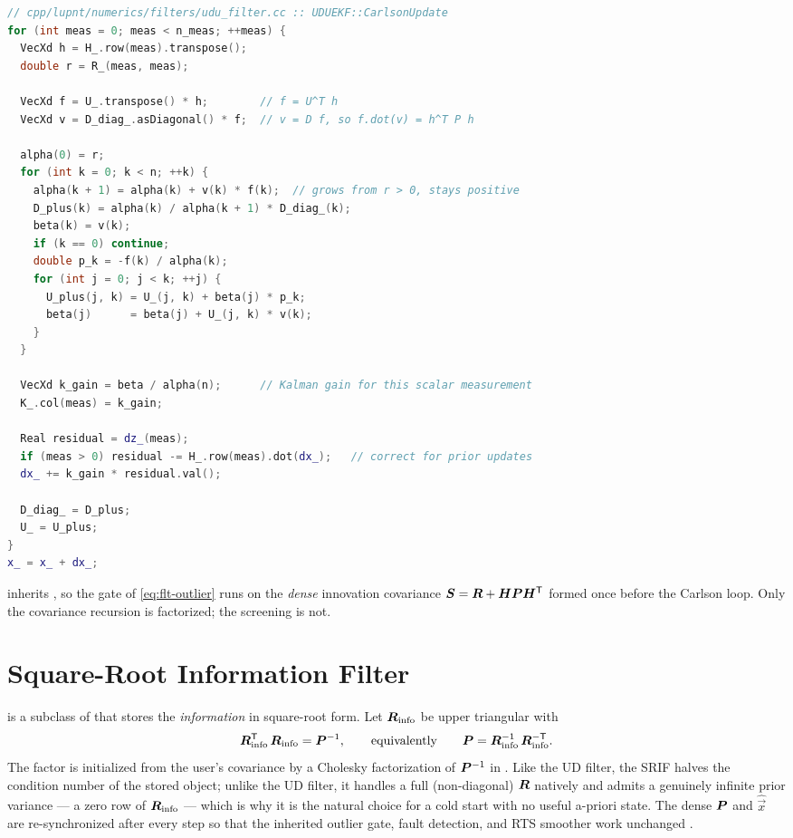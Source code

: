 \begin{lstlisting}[language=cpp, caption={Carlson rank-one sequential UD update.},
                   label={lst:flt-udu-carlson}]
// cpp/lupnt/numerics/filters/udu_filter.cc :: UDUEKF::CarlsonUpdate
for (int meas = 0; meas < n_meas; ++meas) {
  VecXd h = H_.row(meas).transpose();
  double r = R_(meas, meas);

  VecXd f = U_.transpose() * h;        // f = U^T h
  VecXd v = D_diag_.asDiagonal() * f;  // v = D f, so f.dot(v) = h^T P h

  alpha(0) = r;
  for (int k = 0; k < n; ++k) {
    alpha(k + 1) = alpha(k) + v(k) * f(k);  // grows from r > 0, stays positive
    D_plus(k) = alpha(k) / alpha(k + 1) * D_diag_(k);
    beta(k) = v(k);
    if (k == 0) continue;
    double p_k = -f(k) / alpha(k);
    for (int j = 0; j < k; ++j) {
      U_plus(j, k) = U_(j, k) + beta(j) * p_k;
      beta(j)      = beta(j) + U_(j, k) * v(k);
    }
  }

  VecXd k_gain = beta / alpha(n);      // Kalman gain for this scalar measurement
  K_.col(meas) = k_gain;

  Real residual = dz_(meas);
  if (meas > 0) residual -= H_.row(meas).dot(dx_);   // correct for prior updates
  dx_ += k_gain * residual.val();

  D_diag_ = D_plus;
  U_ = U_plus;
}
x_ = x_ + dx_;
\end{lstlisting}

\begin{lupntnote}
 inherits , so the gate of
\cref{eq:flt-outlier} runs on the \emph{dense} innovation covariance
$\bm{S} = \bm{R} + \bm{H}\bm{P}\bm{H}^{\mathsf{T}}$ formed once before the
Carlson loop. Only the covariance recursion is factorized; the screening is
not.
\end{lupntnote}

\section{Square-Root Information Filter}
\label{sec:flt-srif}

 is a subclass of  that stores the \emph{information} in
square-root form. Let $\bm{R}_{\text{info}}$ be upper triangular with
\begin{equation}
  \label{eq:flt-srif-def}
  \bm{R}_{\text{info}}^{\mathsf{T}}\,\bm{R}_{\text{info}} = \bm{P}^{-1},
  \qquad\text{equivalently}\qquad
  \bm{P} = \bm{R}_{\text{info}}^{-1}\,\bm{R}_{\text{info}}^{-\mathsf{T}} .
\end{equation}
The factor is initialized from the user's covariance by a Cholesky
factorization of $\bm{P}^{-1}$ in . Like the UD filter,
the SRIF halves the condition number of the stored object; unlike the UD
filter, it handles a full (non-diagonal) $\bm{R}$ natively and admits a
genuinely infinite prior variance --- a zero row of $\bm{R}_{\text{info}}$ ---
which is why it is the natural choice for a cold start with no useful a-priori
state. The dense $\bm{P}$ and $\hat{\vec{x}}$ are re-synchronized after every
step so that the inherited outlier gate, fault detection, and RTS smoother work
unchanged \citep[Ch.~5]{tapley2004}.

